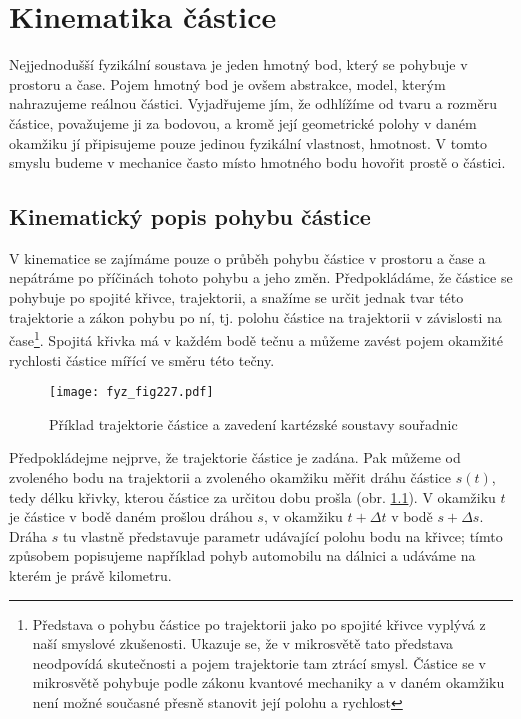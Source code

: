 {
\chapter{Kinematika částice}
\minitoc
  Nejjednodušší fyzikální soustava je jeden hmotný bod, který se pohybuje v prostoru a čase. Pojem
  hmotný bod je ovšem abstrakce, model, kterým nahrazujeme reálnou částici. Vyjadřujeme jím, že
  odhlížíme od tvaru a rozměru částice, považujeme ji za bodovou, a kromě její geometrické polohy v
  daném okamžiku jí připisujeme pouze jedinou fyzikální vlastnost, hmotnost. V tomto smyslu budeme
  v mechanice často místo hmotného bodu hovořit prostě o částici.
  \section{Kinematický popis pohybu částice}
    V kinematice se zajímáme pouze o průběh pohybu částice v prostoru a čase a nepátráme po
    příčinách tohoto pohybu a jeho změn. Předpokládáme, že částice se pohybuje po spojité křivce,
    trajektorii, a snažíme se určit jednak tvar této trajektorie a zákon pohybu po ní, tj. polohu
    částice na trajektorii v závislosti na čase\footnote{Představa o pohybu částice po trajektorii
    jako po spojité křivce vyplývá z naší smyslové zkušenosti. Ukazuje se, že v mikrosvětě tato
    představa neodpovídá skutečnosti a pojem trajektorie tam ztrácí smysl. Částice se v mikrosvětě
    pohybuje podle zákonu kvantové mechaniky a v daném okamžiku není možné současné přesně stanovit
    její polohu a rychlost}. Spojitá křivka má v každém bodě tečnu a můžeme zavést pojem okamžité
    rychlosti částice mířící ve směru této tečny.
  
    \begin{figure}[ht!]
      \centering
      \texttt{[image: fyz\_fig227.pdf]}
      \caption{Příklad trajektorie částice a zavedení kartézské soustavy souřadnic}
      \label{fyz:fig227}
    \end{figure}
  
    Předpokládejme nejprve, že trajektorie částice je zadána. Pak můžeme od zvoleného bodu na
    trajektorii a zvoleného okamžiku měřit dráhu částice $s(t)$, tedy délku křivky, kterou částice
    za určitou dobu prošla (obr. \ref{fyz:fig227}). V okamžiku $t$ je částice v bodě daném
    prošlou dráhou $s$, v okamžiku $t + \Delta t$ v bodě $s + \Delta s$. Dráha $s$ tu vlastně
    představuje parametr udávající polohu bodu na křivce; tímto způsobem popisujeme například pohyb
    automobilu na dálnici a udáváme na kterém je právě kilometru.
  
}
